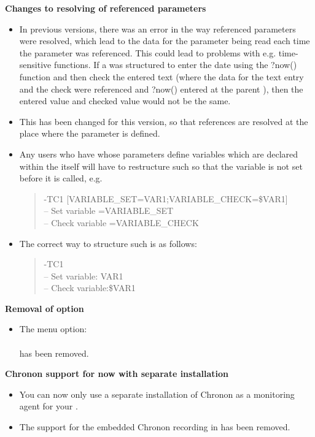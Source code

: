 \textbf{Changes to resolving of referenced parameters}\\
\begin{itemize}
\item In previous versions, there was an error in the way referenced parameters were resolved, which lead to the data for the parameter being read each time the parameter was referenced. This could lead to problems with e.g. time-sensitive functions. If a \gdcase{} was structured to enter the date using the ?now() function and then check the entered text (where the data for the text entry and the check were referenced and ?now() entered at the parent \gdcase{}), then the entered value and checked value would not be the same.
\item This has been changed for this version, so that references are resolved at the place where the parameter is defined. 
\item Any users who have \gdcases{} whose parameters define variables which are declared within the \gdcase{} itself will have to restructure such \gdcases{} so that the variable is not set before it is called, e.g.
\begin{quote}
-TC1 [VARIABLE\_SET=VAR1;VARIABLE\_CHECK=\$VAR1]\\
-- Set variable =VARIABLE\_SET\\
-- Check variable =VARIABLE\_CHECK
\end{quote}
\item The correct way to structure such \gdcases{} is as follows:
\begin{quote}
-TC1\\
-- Set variable: VAR1\\
-- Check variable:\$VAR1
\end{quote}
\end{itemize}

\textbf{Removal of option }
\begin{itemize}
\item The menu option: \\
\\
has been removed.
\end{itemize}

\textbf{Chronon support for \gdauts{} now with separate installation}
\begin{itemize}
\item You can now only use a separate installation of Chronon as a monitoring agent for your \gdaut{}. 
\item The support for the embedded Chronon recording in \gdauts{} has been removed.
\end{itemize}
